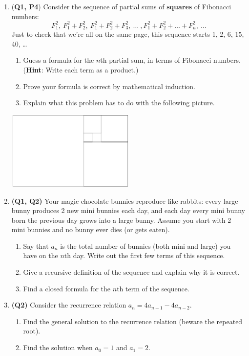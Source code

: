 \documentclass[12pt]{article}
\begin{document}
\begin{enumerate}
\item (\textbf{Q1, P4}) Consider the sequence of partial sums of \textbf{squares} of Fibonacci numbers: 
\[F_1^2,\ F_1^2 + F_2^2,\ F_1^2+F_2^2 + F_3^2,\ \ldots\ , F_1^2+F_2^2 + \ldots + F_n^2,\ \ldots\]
Just to check that we're all on the same page, this sequence starts 1, 2, 6, 15, 40, \ldots
\begin{enumerate}
    \item Guess a formula for the $n$th partial sum, in terms of Fibonacci numbers. \\(\textbf{Hint}: Write each term as a product.) 
    \item Prove your formula is correct by mathematical induction.
    \item Explain what this problem has to do with the following picture.
\end{enumerate}
\begin{center}
\includegraphics[width=0.5\textwidth]{golden-rectangles.png}
\end{center}

\item \textbf{(Q1, Q2)}  Your magic chocolate bunnies reproduce like rabbits: every large bunny produces 2 new mini bunnies each day, and each day every mini bunny born the previous day grows into a large bunny. Assume you start with 2 mini bunnies and no bunny ever dies (or gets eaten).
\begin{enumerate}
    \item Say that $a_n$ is the total number of bunnies (both mini and large) you have on the $n$th day. Write out the first few terms of this sequence.
    \item Give a recursive definition of the sequence and explain why it is correct. 
    \item Find a closed formula for the $n$th term of the sequence.
\end{enumerate}

\item \textbf{(Q2)} Consider the recurrence relation $a_n = 4a_{n-1} - 4a_{n-2}$.
\begin{enumerate}
    \item Find the general solution to the recurrence relation (beware the repeated root).
    \item Find the solution when $a_0 = 1$ and $a_1 = 2$.
\end{enumerate}


\end{enumerate}
\end{document}
